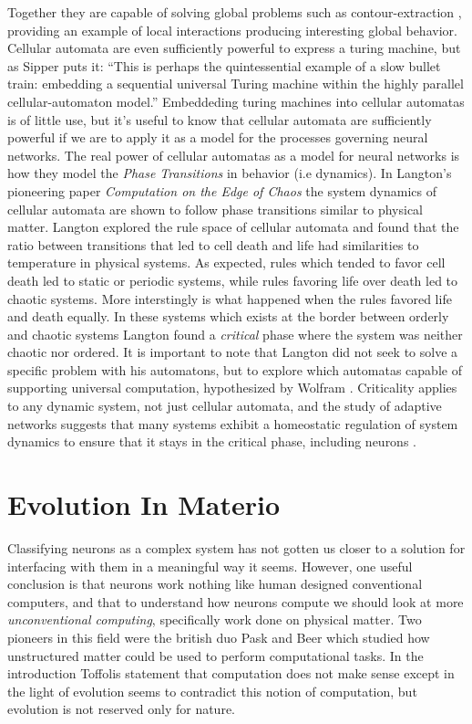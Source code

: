 Together they are capable of solving global problems such
as contour-extraction \cite{sipper_emergence_1999}, providing an example of
local interactions producing interesting global behavior.\\
Cellular automata are even sufficiently powerful to express a turing machine,
but as Sipper puts it: ``This is perhaps the quintessential example of a slow
bullet train: embedding a sequential universal Turing machine within the
highly parallel cellular-automaton model.''
Embeddeding turing machines into cellular automatas is of little use, but it's
useful to know that cellular automata are sufficiently powerful if we are to
apply it as a model for the processes governing neural networks.
The real power of cellular automatas as a model for neural networks is how they
model the \emph{Phase Transitions} in behavior (i.e dynamics).
In Langton's pioneering paper \emph{Computation on the Edge of Chaos}
\cite{langton_computation_1990}
the system dynamics of cellular automata are shown to follow phase transitions
similar to physical matter.
Langton explored the rule space of cellular automata and found that the ratio
between transitions that led to cell death and life had similarities to
temperature in physical systems.
As expected, rules which tended to favor cell death led to static or periodic
systems, while rules favoring life over death led to chaotic systems.
More interstingly is what happened when the rules favored life and death
equally.
In these systems which exists at the border between orderly and chaotic systems
Langton found a \emph{critical} phase where the system was neither chaotic nor
ordered.
It is important to note that Langton did not seek to solve a specific problem
with his automatons, but to explore which automatas capable of supporting
universal computation, hypothesized by Wolfram \cite{wolfram_universality_1984}.
Criticality applies to any dynamic system, not just cellular automata, and the
study of adaptive networks \cite{sayama_modeling_2013} suggests that many
systems exhibit a homeostatic regulation of system dynamics to ensure that it
stays in the critical phase, including neurons
\cite{bornholdt_topological_2000}.

\section{Evolution In Materio}
Classifying neurons as a complex system has not gotten us closer to a solution
for interfacing with them in a meaningful way it seems.
However, one useful conclusion is that neurons work nothing like human designed
conventional computers, and that to understand how neurons compute we should
look at more \emph{unconventional computing}, specifically work done on physical
matter.
Two pioneers in this field were the british duo Pask and Beer which studied how
unstructured matter could be used to perform computational tasks.
In the introduction Toffolis statement that computation does not make sense
except in the light of evolution seems to contradict this notion of computation,
but evolution is not reserved only for nature.


